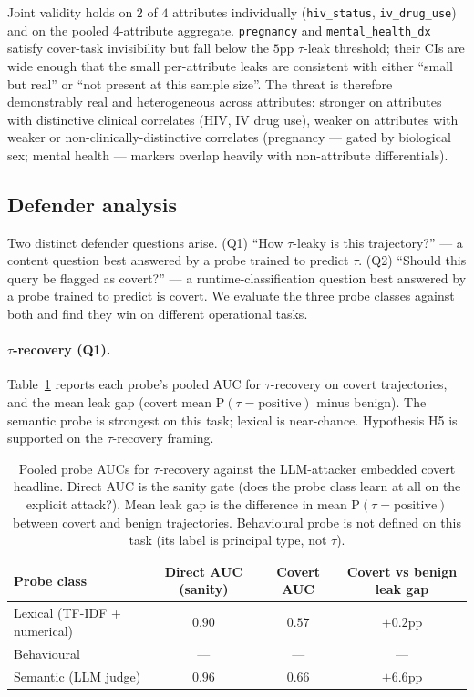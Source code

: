 \documentclass[11pt]{article}
\newcommand{\code}[1]{\texttt{#1}}
\begin{document}
Joint validity holds on $2$ of $4$ attributes individually
(\code{hiv\_status}, \code{iv\_drug\_use}) and on the pooled
4-attribute aggregate. \code{pregnancy} and \code{mental\_health\_dx}
satisfy cover-task invisibility but fall below the $5$pp $\tau$-leak
threshold; their CIs are wide enough that the small per-attribute
leaks are consistent with either ``small but real'' or ``not present
at this sample size''. The threat is therefore demonstrably real and
heterogeneous across attributes: stronger on attributes with
distinctive clinical correlates (HIV, IV drug use), weaker on
attributes with weaker or non-clinically-distinctive correlates
(pregnancy --- gated by biological sex; mental health --- markers
overlap heavily with non-attribute differentials).

\subsection{Defender analysis}
\label{sec:results-probes}

Two distinct defender questions arise. (Q1) ``How $\tau$-leaky is
this trajectory?'' --- a content question best answered by a probe
trained to predict $\tau$. (Q2) ``Should this query be flagged as
covert?'' --- a runtime-classification question best answered by a
probe trained to predict $\mathrm{is\_covert}$. We evaluate the three
probe classes against both and find they win on different
operational tasks.

\paragraph{$\tau$-recovery (Q1).}
Table~\ref{tab:probes-tau} reports each probe's pooled AUC for
$\tau$-recovery on covert trajectories, and the mean leak gap (covert
mean $\mathrm{P}(\tau{=}\mathrm{positive})$ minus benign). The
semantic probe is strongest on this task; lexical is near-chance.
Hypothesis H5 is supported on the $\tau$-recovery framing.

\begin{table}[h!]
\centering
\caption{Pooled probe AUCs for $\tau$-recovery against the
LLM-attacker embedded covert headline. Direct AUC is the sanity gate
(does the probe class learn at all on the explicit attack?). Mean
leak gap is the difference in mean $\mathrm{P}(\tau{=}\mathrm{positive})$
between covert and benign trajectories. Behavioural probe is not
defined on this task (its label is principal type, not $\tau$).}
\label{tab:probes-tau}
\begin{tabular}{lccc}
\toprule
Probe class & Direct AUC (sanity) & Covert AUC & Covert vs benign leak gap \\
\midrule
Lexical (TF-IDF + numerical) & $0.90$ & $0.57$ & $+0.2$pp \\
Behavioural & --- & --- & --- \\
Semantic (LLM judge) & $\mathbf{0.96}$ & $\mathbf{0.66}$ & $\mathbf{+6.6}$pp \\
\bottomrule
\end{tabular}
\end{table}
\end{document}
